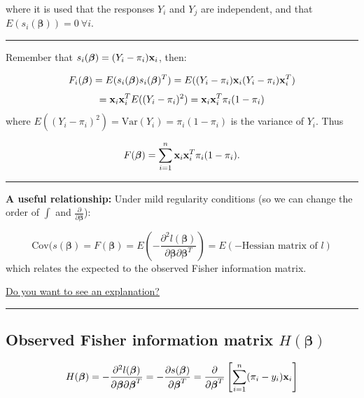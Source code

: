 \documentclass[
]{article}
\begin{document}
where it is used that the responses \(Y_i\) and \(Y_j\) are independent,
and that \(E(s_i(\boldsymbol{\beta})) = 0 \ \forall i\).

\begin{center}\rule{0.5\linewidth}{0.5pt}\end{center}

Remember that \(s_i(\boldsymbol{\beta})=(Y_i-\pi_i){\bf x}_i\), then:

\[ F_i(\boldsymbol{\beta}) = E(s_i(\boldsymbol{\beta})s_i(\boldsymbol{\beta})^T) = E((Y_i-\pi_i){\bf x}_i(Y_i-\pi_i){\bf x}_i^T) \]
\[= {\bf x}_i{\bf x}_i^T E((Y_i-\pi_i)^2) = {\bf x}_i{\bf x}_i^T \pi_i(1-\pi_i) \]
where \(E((Y_i-\pi_i)^2)=\text{Var}(Y_i)=\pi_i(1-\pi_i)\) is the
variance of \(Y_i\). Thus

\[F(\boldsymbol{\beta}) = \sum_{i=1}^n {\bf x}_i{\bf x}_i^T \pi_i(1-\pi_i).\]

\begin{center}\rule{0.5\linewidth}{0.5pt}\end{center}

\textbf{A useful relationship:} Under mild regularity conditions (so we
can change the order of \(\int\) and
\(\frac{\partial}{\partial \boldsymbol{\beta}}\)):

\[\text{Cov}(s(\boldsymbol{\beta})=F(\boldsymbol{\beta}) = E\left( -\frac{\partial^2l(\boldsymbol{\beta})}{\partial\boldsymbol{\beta}\partial\boldsymbol{\beta}^T} \right) = E(-\text{Hessian matrix of }l)\]
which relates the expected to the observed Fisher information matrix.

\href{ExpectedFisherinfo.pdf}{Do you want to see an explanation?}

\begin{center}\rule{0.5\linewidth}{0.5pt}\end{center}

\hypertarget{observed-fisher-information-matrix-hboldsymbolbeta}{%
\subsection{\texorpdfstring{Observed Fisher information matrix
\(H(\boldsymbol{\beta})\)}{Observed Fisher information matrix H(\textbackslash boldsymbol\{\textbackslash beta\})}}\label{observed-fisher-information-matrix-hboldsymbolbeta}}

\[H(\boldsymbol{\beta}) = -\frac{\partial^2l(\boldsymbol{\beta})}{\partial\boldsymbol{\beta}\partial\boldsymbol{\beta}^T} = -\frac{\partial s(\boldsymbol{\beta})}{\partial\boldsymbol{\beta}^T} = \frac{\partial}{\partial\boldsymbol{\beta}^T}\left[\sum_{i=1}^n (\pi_i-y_i){\bf x}_i \right] \]
\end{document}
